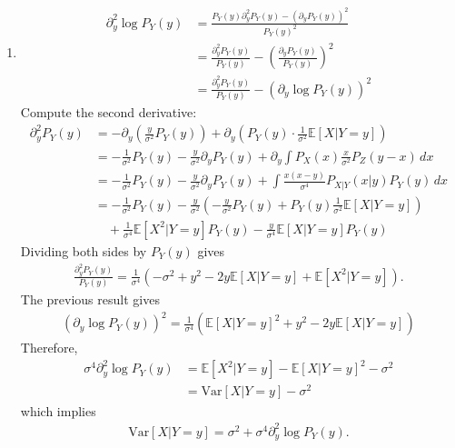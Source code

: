 \documentclass[12pt]{article}
\newcommand{\fE}{\mathbb{E}}
\renewcommand{\Var}[1]{\mathrm{Var}\left[#1\right]}
\begin{document}
\begin{enumerate}
\begin{solution}
\begin{enumerate}
    \item
    \begin{align*}
        \partial_y^2 \log P_Y(y)
        &= \frac{P_Y(y)\partial_y^2 P_Y(y)-(\partial_y P_Y(y))^2}{P_Y(y)^2} \\
        &= \frac{\partial_y^2 P_Y(y)}{P_Y(y)} - \left(\frac{\partial_y P_Y(y)}{P_Y(y)}\right)^2 \\
        &= \frac{\partial_y^2 P_Y(y)}{P_Y(y)} - \left(\partial_y \log P_Y(y)\right)^2
    \end{align*}
    Compute the second derivative:
    \begin{align*}
        \partial_y^2 P_Y(y) 
        &= -\partial_y \left(\frac{y}{\sigma^2} P_Y(y)\right) + \partial_y \left(P_Y(y) \cdot \frac{1}{\sigma^2} \fE[X | Y = y]\right) \\
        &= -\frac{1}{\sigma^2} P_Y(y) - \frac{y}{\sigma^2} \partial_y P_Y(y) + \partial_y \int P_X(x) \frac{x}{\sigma^2} P_Z(y - x)\, dx \\
        &= -\frac{1}{\sigma^2} P_Y(y) - \frac{y}{\sigma^2} \partial_y P_Y(y) + \int \frac{x(x - y)}{\sigma^4} P_{X|Y}(x | y) P_Y(y)\, dx \\
        &= -\frac{1}{\sigma^2} P_Y(y) - \frac{y}{\sigma^2} \left(-\frac{y}{\sigma^2} P_Y(y) + P_Y(y) \frac{1}{\sigma^2} \fE[X | Y = y]\right) \\
        &\quad + \frac{1}{\sigma^4} \fE[X^2 | Y = y] P_Y(y) - \frac{y}{\sigma^4} \fE[X | Y = y] P_Y(y)
    \end{align*}
    Dividing both sides by $P_Y(y)$ gives
    \begin{align*}
        \frac{\partial_y^2 P_Y(y)}{P_Y(y)} 
        = \frac{1}{\sigma^4} \left(-\sigma^2 + y^2 - 2y \fE[X | Y = y] + \fE[X^2 | Y = y]\right).
    \end{align*}
    The previous result gives
    \begin{align*}
        \left(\partial_y \log P_Y(y)\right)^2 
        = \frac{1}{\sigma^4} \left( \fE[X | Y = y]^2 + y^2 - 2y \fE[X | Y = y] \right)
    \end{align*}
    Therefore,
    \begin{align*}
        \sigma^4 \partial_y^2 \log P_Y(y) 
        &= \fE[X^2 | Y = y] - \fE[X | Y = y]^2 - \sigma^2 \\
        &= \Var{X | Y = y} - \sigma^2
    \end{align*}
    which implies
    \begin{align*}
        \Var{X | Y = y} = \sigma^2 + \sigma^4 \partial_y^2 \log P_Y(y).
    \end{align*}
\end{enumerate}
\end{solution}



\end{enumerate}
\end{document}
